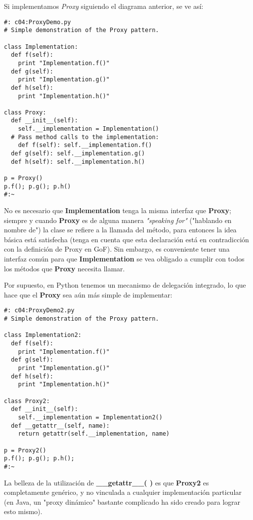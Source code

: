 Si implementamos \textit{Proxy} siguiendo el diagrama anterior, se ve así:

 \begin{lstlisting} 
#: c04:ProxyDemo.py 
# Simple demonstration of the Proxy pattern. 

class Implementation: 
  def f(self):  
    print "Implementation.f()" 
  def g(self):  
    print "Implementation.g()"  
  def h(self):  
    print "Implementation.h()" 
    
class Proxy: 
  def __init__(self):  
    self.__implementation = Implementation()  
  # Pass method calls to the implementation: 
    def f(self): self.__implementation.f()  
  def g(self): self.__implementation.g()  
  def h(self): self.__implementation.h()  
  
p = Proxy() 
p.f(); p.g(); p.h() 
#:~ 
 \end{lstlisting}
 
No es necesario que \textbf{Implementation} tenga la misma interfaz que \textbf{Proxy}; siempre y cuando \textbf{Proxy} es de alguna manera \textit{ "speaking for"} ("hablando en nombre de") la clase se refiere a la llamada del método, para entonces la idea básica está satisfecha (tenga en cuenta que esta declaración está en contradicción con la definición de Proxy en GoF). Sin embargo, es conveniente tener una interfaz común para que \textbf{Implementation} se vea obligado a cumplir con todos los métodos que \textbf{Proxy} necesita llamar. \newline
	
Por supuesto, en Python tenemos un mecanismo de delegación integrado, lo que hace que el \textbf{Proxy} sea aún más simple de implementar:   \newline

\begin{lstlisting} 
#: c04:ProxyDemo2.py 
# Simple demonstration of the Proxy pattern. 

class Implementation2: 
  def f(self):  
    print "Implementation.f()" 
  def g(self):  
    print "Implementation.g()"  
  def h(self):  
    print "Implementation.h()" 
    
class Proxy2: 
  def __init__(self):  
    self.__implementation = Implementation2()  
  def __getattr__(self, name): 
    return getattr(self.__implementation, name) 
    
p = Proxy2() 
p.f(); p.g(); p.h(); 
#:~ 
\end{lstlisting}
La belleza de la utilización de  \textbf{\_\_getattr\_\_( )} es que \textbf{Proxy2} es completamente genérico, y no vinculada a cualquier implementación particular (en Java, un "proxy dinámico" bastante complicado ha sido creado para lograr esto mismo). 

